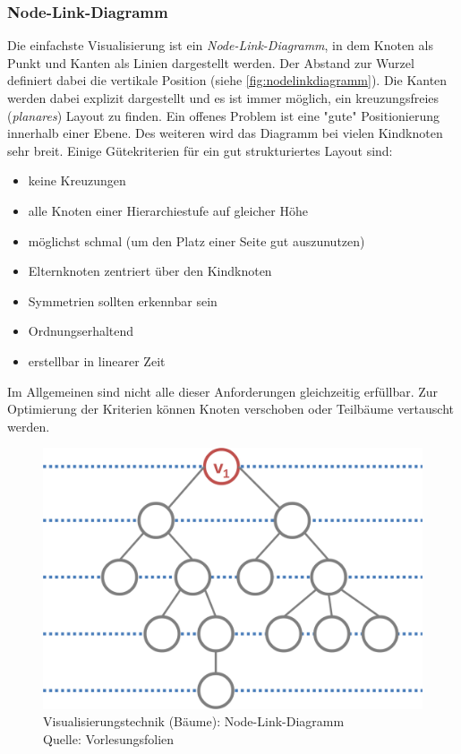 			\subsubsection{Node-Link-Diagramm}
				Die einfachste Visualisierung ist ein \emph{Node-Link-Diagramm}, in dem Knoten als Punkt und Kanten als Linien dargestellt werden. Der Abstand zur Wurzel definiert dabei die vertikale Position (siehe \autoref{fig:nodelinkdiagramm}). Die Kanten werden dabei explizit dargestellt und es ist immer möglich, ein kreuzungsfreies (\emph{planares}) Layout zu finden. Ein offenes Problem ist eine "gute" Positionierung innerhalb einer Ebene. Des weiteren wird das Diagramm bei vielen Kindknoten sehr breit. Einige Gütekriterien für ein gut strukturiertes Layout sind:
				\begin{itemize}
					\item keine Kreuzungen
					\item alle Knoten einer Hierarchiestufe auf gleicher Höhe
					\item möglichst schmal (um den Platz einer Seite gut auszunutzen)
					\item Elternknoten zentriert über den Kindknoten
					\item Symmetrien sollten erkennbar sein
					\item Ordnungserhaltend
					\item erstellbar in linearer Zeit
				\end{itemize}
				Im Allgemeinen sind nicht alle dieser Anforderungen gleichzeitig erfüllbar. Zur Optimierung der Kriterien können \bspw Knoten verschoben oder Teilbäume vertauscht werden.

				\begin{figure}
					\centering
					\includegraphics[width=0.5\linewidth]{nodelinkdiagram}
					\caption[Visualisierungstechnik (Bäume): Node-Link-Diagramm]{Visualisierungstechnik (Bäume): Node-Link-Diagramm\\Quelle: Vorlesungsfolien}
					\label{fig:nodelinkdiagramm}
				\end{figure}

